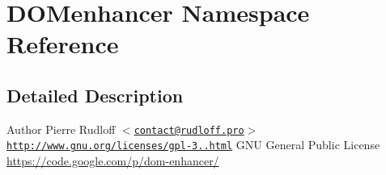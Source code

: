 \hypertarget{namespaceDOMenhancer}{\section{\-D\-O\-Menhancer \-Namespace \-Reference}
\label{namespaceDOMenhancer}
}


\subsection{\-Detailed \-Description}
\begin{DoxyAuthor}{\-Author}
\-Pierre \-Rudloff $<$\href{mailto:contact@rudloff.pro}{\tt contact@rudloff.\-pro}$>$  \href{http://www.gnu.org/licenses/gpl-3.0.html}{\tt http\-://www.\-gnu.\-org/licenses/gpl-\/3..\-html} \-G\-N\-U \-General \-Public \-License \hyperlink{}{https\-://code.\-google.\-com/p/dom-\/enhancer/}
\end{DoxyAuthor}
